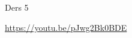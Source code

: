 \documentclass[12pt,fleqn]{article}\usepackage{../../common}
\begin{document}
Ders 5













\url{https://youtu.be/pJwg2Bk0BDE}
\end{document}
